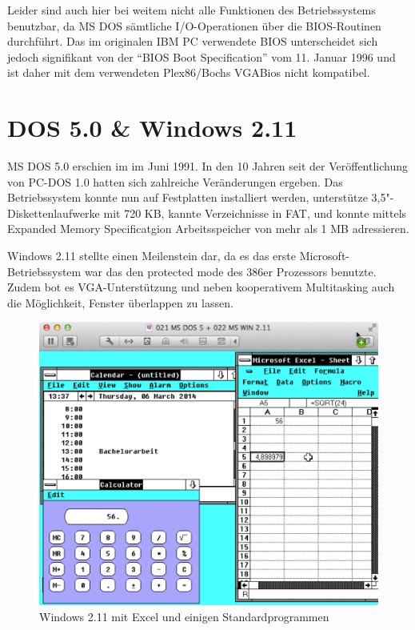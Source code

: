 	Leider sind auch hier bei weitem nicht alle Funktionen des Betriebssystems benutzbar, da MS DOS sämtliche I/O-Operationen über die BIOS-Routinen durchführt.
	Das im originalen IBM PC verwendete BIOS unterscheidet sich jedoch signifikant von der "`BIOS Boot Specification"' vom 11. Januar 1996 und ist daher mit dem verwendeten Plex86/Bochs VGABios nicht kompatibel.

\newpage

\section{DOS 5.0 \& Windows 2.11}

	MS DOS 5.0 erschien im im Juni 1991.
	In den 10 Jahren seit der Veröffentlichung von PC-DOS 1.0 hatten sich zahlreiche Veränderungen ergeben. 
	Das Betriebssystem konnte nun auf Festplatten installiert werden, unterstütze 3,5"-Diskettenlaufwerke mit 720 KB, kannte Verzeichnisse in FAT, und konnte mittels Expanded Memory Specificatgion Arbeitsspeicher von mehr als 1 MB adressieren. 

	Windows 2.11 stellte einen Meilenstein dar, da es das erste Microsoft-Betriebssystem war das den protected mode des 386er Prozessors benutzte. Zudem bot es VGA-Unterstützung und neben kooperativem Multitasking auch die Möglichkeit, Fenster überlappen zu lassen.

	\begin{figure}[p]
		\begin{center}
			\includegraphics[width=\textwidth]{img/WIN211_2}
			\caption{Windows 2.11 mit Excel und einigen Standardprogrammen}
			\label{fig:screenshot-win211excel}
		\end{center}
	\end{figure}

